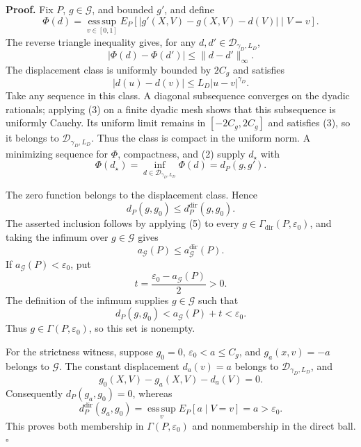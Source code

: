 \textbf{Proof.}
Fix \(P\), \(g\in\mathcal G\), and bounded \(g'\), and define
\[
 \Phi(d)=\operatorname*{ess\,sup}_{v\in[0,1]}
 E_P\!\left[|g'(X,V)-g(X,V)-d(V)|\mid V=v\right]. \tag{1}
\]
The reverse triangle inequality gives, for any \(d,d'\in\mathcal D_{\gamma_D,L_D}\),
\[
 |\Phi(d)-\Phi(d')|\le\|d-d'\|_\infty. \tag{2}
\]
The displacement class is uniformly bounded by \(2C_g\) and satisfies
\[
 |d(u)-d(v)|\le L_D|u-v|^{\gamma_D}. \tag{3}
\]
Take any sequence in this class. A diagonal subsequence converges on the dyadic rationals; applying (3) on a finite dyadic mesh shows that this subsequence is uniformly Cauchy. Its uniform limit remains in \([-2C_g,2C_g]\) and satisfies (3), so it belongs to \(\mathcal D_{\gamma_D,L_D}\). Thus the class is compact in the uniform norm. A minimizing sequence for \(\Phi\), compactness, and (2) supply \(d_\star\) with
\[
 \Phi(d_\star)=\inf_{d\in\mathcal D_{\gamma_D,L_D}}\Phi(d)=d_P(g,g'). \tag{4}
\]

The zero function belongs to the displacement class. Hence
\[
 d_P(g,g_0)\le d_P^{\mathrm{dir}}(g,g_0). \tag{5}
\]
The asserted inclusion follows by applying (5) to every \(g\in\Gamma_{\mathrm{dir}}(P,\varepsilon_0)\), and taking the infimum over \(g\in\mathcal G\) gives
\[
 a_{\mathcal G}(P)\le a_{\mathcal G}^{\mathrm{dir}}(P). \tag{6}
\]
If \(a_{\mathcal G}(P)<\varepsilon_0\), put
\[
 t=\frac{\varepsilon_0-a_{\mathcal G}(P)}2>0.
\]
The definition of the infimum supplies \(g\in\mathcal G\) such that
\[
 d_P(g,g_0)<a_{\mathcal G}(P)+t<\varepsilon_0. \tag{7}
\]
Thus \(g\in\Gamma(P,\varepsilon_0)\), so this set is nonempty.

For the strictness witness, suppose \(g_0=0\), \(\varepsilon_0<a\le C_g\), and \(g_a(x,v)=-a\) belongs to \(\mathcal G\). The constant displacement \(d_a(v)=a\) belongs to \(\mathcal D_{\gamma_D,L_D}\), and
\[
 g_0(X,V)-g_a(X,V)-d_a(V)=0.
\]
Consequently \(d_P(g_a,g_0)=0\), whereas
\[
 d_P^{\mathrm{dir}}(g_a,g_0)
 =\operatorname*{ess\,sup}_{v}E_P[a\mid V=v]=a>\varepsilon_0. \tag{8}
\]
This proves both membership in \(\Gamma(P,\varepsilon_0)\) and nonmembership in the direct ball. \(\square\)
